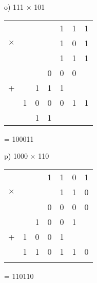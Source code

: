 \begin{figure}[H]
    \begin{minipage}[t]{0.45\textwidth}
        o) 111 $\times$ 101
        \begin{table}[H]
            \centering
            \begin{tabularx}{0.6\linewidth}{rXXXXXX}
                & & &  & 1 & 1 & 1 \\
                $\times$ & & &  & 1 & 0 & 1 \\
                \cline{4-7}
                &  &  &  & 1 & 1 & 1 \\
                &  &  & 0 & 0 & 0 & \\
                +&  & 1 & 1 & 1 &  & \\
                \cline{2-7}
                & 1 & 0 & 0 & 0 & 1 & 1 \\
                \cline{2-7}
                &  & 1 & 1 &  &  & \\
            \end{tabularx}
        \end{table}
        = 100011
    \end{minipage}\hfill
    \begin{minipage}[t]{0.45\textwidth}
        p) 1000 $\times$ 110
        \begin{table}[H]
            \centering
            \begin{tabularx}{0.6\linewidth}{rXXXXXX}
                & & & 1 & 1 & 0 & 1 \\
                $\times$ & & &  & 1 & 1 & 0 \\
                \cline{5-7}
                &  &  & 0 & 0 & 0 & 0 \\
                &  & 1 & 0 & 0 & 1 & \\
                +& 1 & 0 & 0 & 1 &  & \\
                \cline{2-7}
                & 1 & 1 & 0 & 1 & 1 & 0 \\
                \cline{2-7}
                &  &  &  &  &  & \\
            \end{tabularx}
        \end{table}
        = 110110
    \end{minipage}\hfill
\end{figure}

